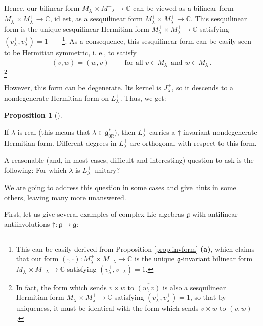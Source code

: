 \documentclass
[numbers=enddot,12pt,final,onecolumn,german,notitlepage]{scrartcl}%
\theoremstyle{definition}
\newtheorem{prop}[theo]{Proposition}
\newenvironment{proposition}[1][]
{\begin{prop}[#1]\begin{leftbar}}
{\end{leftbar}\end{prop}}
\begin{document}
Hence, our bilinear form $M_{\lambda}^{+}\times M_{-\lambda}^{-}%
\rightarrow\mathbb{C}$ can be viewed as a bilinear form $M_{\lambda}^{+}%
\times\overline{M_{\lambda}^{+}}\rightarrow\mathbb{C}$, id est, as a
sesquilinear form $M_{\lambda}^{+}\times M_{\lambda}^{+}\rightarrow\mathbb{C}%
$. This sesquilinear form is the unique sesquilinear Hermitian form
$M_{\lambda}^{+}\times M_{\lambda}^{+}\rightarrow\mathbb{C}$ satisfying
$\left(  v_{\lambda}^{+},v_{\lambda}^{+}\right)  =1$\ \ \ \ \footnote{This can
be easily derived from Proposition \ref{prop.invform} \textbf{(a)}, which
claims that our form $\left(  \cdot,\cdot\right)  :M_{\lambda}^{+}\times
M_{-\lambda}^{-}\rightarrow\mathbb{C}$ is the unique $\mathfrak{g}$-invariant
bilinear form $M_{\lambda}^{+}\times M_{-\lambda}^{-}\rightarrow\mathbb{C}$
satisfying $\left(  v_{\lambda}^{+},v_{-\lambda}^{-}\right)  =1$.}. As a
consequence, this sesquilinear form can be easily seen to be Hermitian
symmetric, i. e., to satisfy%
\[
\left(  v,w\right)  =\overline{\left(  w,v\right)  }%
\ \ \ \ \ \ \ \ \ \ \text{for all }v\in M_{\lambda}^{+}\text{ and }w\in
M_{\lambda}^{+}.
\]
\footnote{In fact, the form which sends $v\times w$ to $\overline{\left(
w,v\right)  }$ is also a sesquilinear Hermitian form $M_{\lambda}^{+}\times
M_{\lambda}^{+}\rightarrow\mathbb{C}$ satisfying $\left(  v_{\lambda}%
^{+},v_{\lambda}^{+}\right)  =1$, so that by uniqueness, it must be identical
with the form which sends $v\times w$ to $\left(  v,w\right)  $.}

However, this form can be degenerate. Its kernel is $J_{\lambda}^{+}$, so it
descends to a nondegenerate Hermitian form on $L_{\lambda}^{+}$. Thus, we get:

\begin{proposition}
\label{prop.hermitian.lambdareal}If $\lambda$ is real (this means that
$\lambda\in\mathfrak{g}_{0\mathbb{R}}^{\ast}$), then $L_{\lambda}^{+}$ carries
a $\dag$-invariant nondegenerate Hermitian form. Different degrees in
$L_{\lambda}^{+}$ are orthogonal with respect to this form.
\end{proposition}

A reasonable (and, in most cases, difficult and interesting) question to ask
is the following: For which $\lambda$ is $L_{\lambda}^{+}$ unitary?

We are going to address this question in some cases and give hints in some
others, leaving many more unanswered.

First, let us give several examples of complex Lie algebras $\mathfrak{g}$
with antilinear antiinvolutions $\dag:\mathfrak{g}\rightarrow\mathfrak{g}$:
\end{document}
